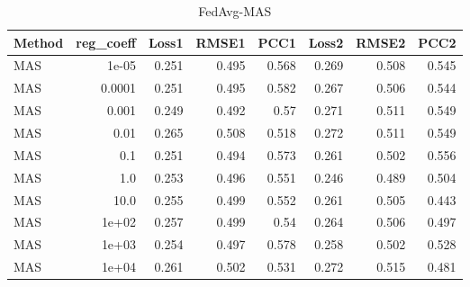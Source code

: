 \begin{table}
\caption{FedAvg-MAS}
\begin{tabular}{lrrrrrrr}
\toprule
Method & reg_coeff & Loss1 & RMSE1 & PCC1 & Loss2 & RMSE2 & PCC2 \\
\midrule
MAS & 1e-05 & 0.251 & 0.495 & 0.568 & 0.269 & 0.508 & 0.545 \\
MAS & 0.0001 & 0.251 & 0.495 & 0.582 & 0.267 & 0.506 & 0.544 \\
MAS & 0.001 & 0.249 & 0.492 & 0.57 & 0.271 & 0.511 & 0.549 \\
MAS & 0.01 & 0.265 & 0.508 & 0.518 & 0.272 & 0.511 & 0.549 \\
MAS & 0.1 & 0.251 & 0.494 & 0.573 & 0.261 & 0.502 & 0.556 \\
MAS & 1.0 & 0.253 & 0.496 & 0.551 & 0.246 & 0.489 & 0.504 \\
MAS & 10.0 & 0.255 & 0.499 & 0.552 & 0.261 & 0.505 & 0.443 \\
MAS & 1e+02 & 0.257 & 0.499 & 0.54 & 0.264 & 0.506 & 0.497 \\
MAS & 1e+03 & 0.254 & 0.497 & 0.578 & 0.258 & 0.502 & 0.528 \\
MAS & 1e+04 & 0.261 & 0.502 & 0.531 & 0.272 & 0.515 & 0.481 \\
\bottomrule
\end{tabular}
\end{table}
